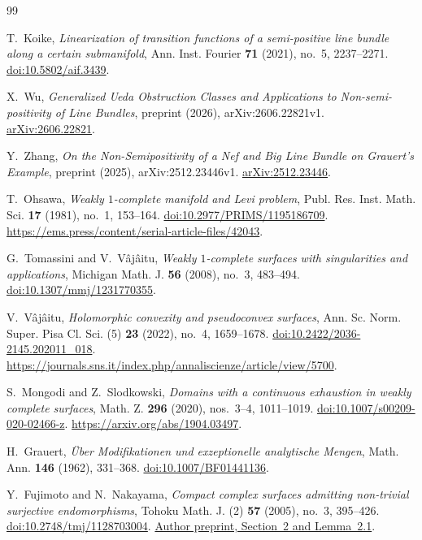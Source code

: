 \documentclass[11pt]{amsart}
\theoremstyle{definition}
\theoremstyle{remark}
\numberwithin{equation}{section}
\begin{document}
\begin{thebibliography}{99}
\raggedright

T.~Koike,
\emph{Linearization of transition functions of a semi-positive line
bundle along a certain submanifold},
Ann. Inst. Fourier \textbf{71} (2021), no.~5, 2237--2271.
\href{https://doi.org/10.5802/aif.3439}{doi:10.5802/aif.3439}.

X.~Wu,
\emph{Generalized Ueda Obstruction Classes and Applications to
Non-semi-positivity of Line Bundles},
preprint (2026), arXiv:2606.22821v1.
\href{https://arxiv.org/abs/2606.22821v1}{arXiv:2606.22821}.

Y.~Zhang,
\emph{On the Non-Semipositivity of a Nef and Big Line Bundle on
Grauert's Example},
preprint (2025), arXiv:2512.23446v1.
\href{https://arxiv.org/abs/2512.23446v1}{arXiv:2512.23446}.

T.~Ohsawa,
\emph{Weakly $1$-complete manifold and Levi problem},
Publ. Res. Inst. Math. Sci. \textbf{17} (1981), no.~1, 153--164.
\href{https://doi.org/10.2977/PRIMS/1195186709}{doi:10.2977/PRIMS/1195186709}.
\url{https://ems.press/content/serial-article-files/42043}.

G.~Tomassini and V.~V\^aj\^aitu,
\emph{Weakly $1$-complete surfaces with singularities and applications},
Michigan Math. J. \textbf{56} (2008), no.~3, 483--494.
\href{https://doi.org/10.1307/mmj/1231770355}{doi:10.1307/mmj/1231770355}.

V.~V\^aj\^aitu,
\emph{Holomorphic convexity and pseudoconvex surfaces},
Ann. Sc. Norm. Super. Pisa Cl. Sci. (5) \textbf{23} (2022),
no.~4, 1659--1678.
\href{https://doi.org/10.2422/2036-2145.202011_018}{doi:10.2422/2036-2145.202011\_018}.
\url{https://journals.sns.it/index.php/annaliscienze/article/view/5700}.

S.~Mongodi and Z.~Slodkowski,
\emph{Domains with a continuous exhaustion in weakly complete surfaces},
Math. Z. \textbf{296} (2020), nos.~3--4, 1011--1019.
\href{https://doi.org/10.1007/s00209-020-02466-z}{doi:10.1007/s00209-020-02466-z}.
\url{https://arxiv.org/abs/1904.03497}.

H.~Grauert,
\emph{\"Uber Modifikationen und exzeptionelle analytische Mengen},
Math. Ann. \textbf{146} (1962), 331--368.
\href{https://doi.org/10.1007/BF01441136}{doi:10.1007/BF01441136}.

Y.~Fujimoto and N.~Nakayama,
\emph{Compact complex surfaces admitting non-trivial surjective endomorphisms},
Tohoku Math. J. (2) \textbf{57} (2005), no.~3, 395--426.
\href{https://doi.org/10.2748/tmj/1128703004}{doi:10.2748/tmj/1128703004}.
\href{https://www.kurims.kyoto-u.ac.jp/preprint/file/RIMS1431.pdf}{Author preprint, Section~2 and Lemma~2.1}.


\end{thebibliography}
\end{document}
